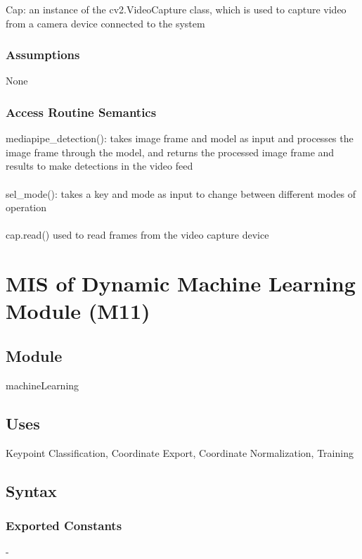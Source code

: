 \documentclass[12pt, titlepage]{article}
\begin{document}
Cap: an instance of the cv2.VideoCapture class, which is used to capture video from a camera device connected to the system\\

\subsubsection{Assumptions}

None\\

\subsubsection{Access Routine Semantics}

mediapipe\_detection(): takes image frame and model as input and processes the image frame through the model, and returns the processed image frame and results to make detections in the video feed\\
\\
sel\_mode(): takes a key and mode as input to change between different modes of operation\\
\\
cap.read() used to read frames from the video capture device\\

\newpage
\section{MIS of Dynamic Machine Learning Module (M11)} \label{M11}

\subsection{Module}

machineLearning\\

\subsection{Uses}

Keypoint Classification, Coordinate Export, Coordinate Normalization, Training\\

\subsection{Syntax}

\subsubsection{Exported Constants}
-
\end{document}
